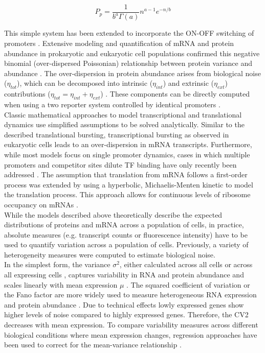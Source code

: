 \begin{equation}
P_p=\frac{1}{b^a\Gamma(a)}n^{a-1} e^{-n/b}
\end{equation}

\noindent This simple system has been extended to incorporate the ON-OFF switching of promoters \citep{Jones2014, Shahrezaei2008}. Extensive modeling and quantification of mRNA and protein abundance in prokaryotic and eukaryotic cell populations confirmed this negative binomial (over-dispersed Poissonian) relationship between protein variance and abundance \citep{Ozbudak2002, Bar-Even2006}. The over-dispersion in protein abundance arises from biological noise ($\eta_{tot}$), which can be decomposed into intrinsic ($\eta_{int}$) and extrinsic ($\eta_{ext}$) contributions ($\eta_{tot}=\eta_{int}+\eta_{ext}$) \citep{Swain2002, Fu2016}. These components can be directly computed when using a two reporter system controlled by identical promoters \citep{Elowitz2002}. \\

Classic mathematical approaches to model transcriptional and translational dynamics use simplified assumptions to be solved analytically. Similar to the described translational bursting, transcriptional bursting as observed in eukaryotic cells \citep{Raj2006} leads to an over-dispersion in mRNA transcripts. Furthermore, while most models focus on single promoter dynamics, cases in which multiple promoters and competitor sites dilute TF binding have only recently been addressed \citep{Das2015a}. The assumption that translation from mRNA follows a first-order process was extended by using a hyperbolic, Michaelis-Menten kinetic to model the translation process. This approach allows for continuous levels of ribosome occupancy on mRNAs \citep{VanDyken2017}. \\ 

While the models described above theoretically describe the expected distributions of proteins and mRNA across a population of cells, in practice, absolute measures (e.g. transcript counts or fluorescence intensity) have to be used to quantify variation across a population of cells. Previously, a variety of heterogeneity measures were computed to estimate biological noise. \\

In the simplest form, the variance $\sigma^2$, either calculated across all cells or across all expressing cells \citep{Shalek2014}, captures variability in RNA and protein abundance and scales linearly with mean expression $\mu$ \citep{Dey2015a}. The squared coefficient of variation or the Fano factor are more widely used to measure heterogeneous RNA expression \citep{Brennecke2013, Jones2014} and protein abundance \citep{Newman2006}. Due to technical effects \citep{Brennecke2013} lowly expressed genes show higher levels of noise compared to highly expressed genes. Therefore, the CV2 decreases with mean expression. To compare variability measures across different biological conditions where mean expression changes, regression approaches have been used to correct for the mean-variance relationship \citep{Kolodziejczyk2015cell, Fan2016}. \\
 
